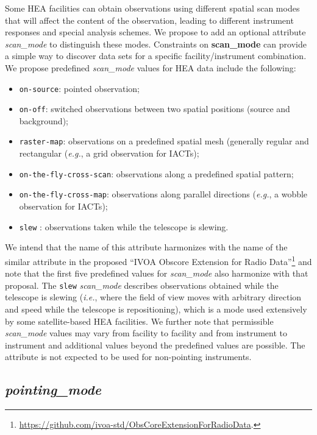 \documentclass[11pt,a4paper]{ivoa}
\begin{document}
Some \gls{HEA} facilities can obtain observations using different spatial scan modes that will affect the content of the observation, leading to different instrument responses and special analysis schemes.  We propose to add an optional attribute {\em scan\_mode\/} to distinguish these modes.  Constraints on {\bf scan\_mode} can provide a simple way to discover data sets for a specific facility/instrument combination.  We propose predefined {\em scan\_mode\/} values for \gls{HEA} data include the following:
\begin{itemize}
	\item \texttt{on-source}: pointed observation;
	\item \texttt{on-off}: switched observations between two spatial positions (source and background);
	\item \texttt{raster-map}: observations on a predefined spatial mesh (generally regular and rectangular ({\em e.g.\/}, a grid observation for \glspl{IACT});
	\item \texttt{on-the-fly-cross-scan}: observations along a predefined spatial pattern;
	\item \texttt{on-the-fly-cross-map}: observations along parallel directions ({\em e.g.\/}, a wobble observation for \glspl{IACT});
	\item \texttt{slew} : observations taken while the telescope is slewing.	
\end{itemize}
We intend that the name of this attribute harmonizes with the name of the similar attribute in the proposed ``IVOA Obscore Extension for Radio Data''\footnote{\url{https://github.com/ivoa-std/ObsCoreExtensionForRadioData}.} and note that the first five predefined values for {\em scan\_mode\/} also harmonize with that proposal.  The \texttt{slew} {\em scan\_mode\/} describes observations obtained while the telescope is slewing ({\em i.e.\/}, where the field of view moves with arbitrary direction and speed while the telescope is repositioning), which is a mode used extensively by some satellite-based \gls{HEA} facilities.  We further note that permissible {\em scan\_mode\/} values may vary from facility to facility and from instrument to instrument and additional values beyond the predefined values are possible. The attribute is not expected to be used for non-pointing instruments.


\subsection{{\em pointing\_mode}}
\end{document}
